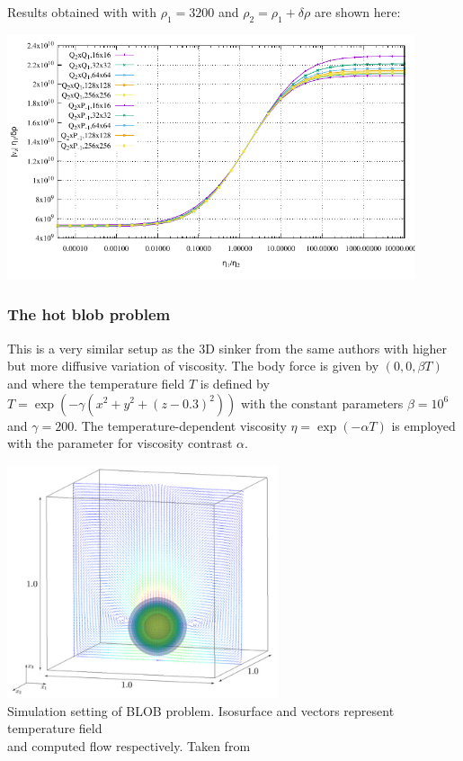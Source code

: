Results obtained with \aspect with $\rho_1=3200$ and $\rho_2=\rho_1+\delta\rho$ are shown here:

\begin{center}
\includegraphics[width=12cm]{images/benchmark_sinkingblock/aspect/v.pdf}
\end{center}


\subsubsection{The hot blob problem}\label{sec:hotblob}

This is a very similar setup as the 3D sinker from the same authors
with higher but more diffusive variation of viscosity.
The body force is given by $(0, 0, \beta T)$ and
where the temperature field $T$ is defined by $T = \exp  (-\gamma (x^2+y^2+(z-0.3)^2))$ 
with the constant parameters $\beta=10^6$ and $\gamma=200$. 
The temperature-dependent viscosity $\eta = \exp( -\alpha T)$ is employed with the parameter for viscosity
contrast $\alpha$.

\begin{center}
\includegraphics[width=8cm]{images/benchmark_hotblob/fumt11}\\
{\captionfont Simulation setting of BLOB problem. Isosurface and vectors represent temperature field \\and computed flow respectively. Taken from \cite{fumt11}}
\end{center}

